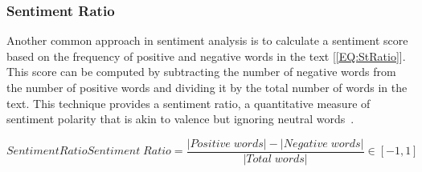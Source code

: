 \subsubsection{Sentiment Ratio}

Another common approach in sentiment analysis is to calculate a sentiment score based on the frequency of positive and negative words in the text [\ref{EQ:StRatio}]. This score can be computed by subtracting the number of negative words from the number of positive words and dividing it by the total number of words in the text. This technique provides a sentiment ratio, a quantitative measure of sentiment polarity that is akin to valence but ignoring neutral words~\cite{STSC}.

\begin{equation}[EQ:StRatio]{Sentiment Ratio}
    Sentiment\;Ratio = \frac{|Positive\;words| - |Negative\;words|}{|Total\;words|} \in [-1, 1]
\end{equation}
